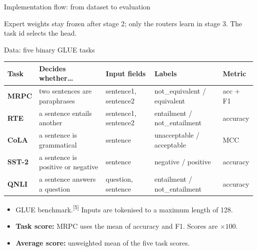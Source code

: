 \documentclass[aspectratio=169,10pt]{beamer}
\newcommand{\refm}[1]{\textsuperscript{\tiny[#1]}}
\begin{document}
\begin{frame}{Implementation flow: from dataset to evaluation}
  \vfill
  \raggedright
  {\footnotesize Expert weights stay frozen after stage 2; only the routers learn in stage 3. The task id selects the head.}
\end{frame}

\begin{frame}{Data: five binary GLUE tasks}
  \centering
  \footnotesize
  \renewcommand{\arraystretch}{1.25}
  \begin{tabularx}{\linewidth}{>{\bfseries}l X l l l}
    \toprule
    Task & Decides whether\ldots & Input fields & Labels & Metric\\
    \midrule
    MRPC & two sentences are paraphrases & sentence1, sentence2 & not\_equivalent / equivalent & acc + F1\\
    RTE & a sentence entails another & sentence1, sentence2 & entailment / not\_entailment & accuracy\\
    CoLA & a sentence is grammatical & sentence & unacceptable / acceptable & MCC\\
    SST-2 & a sentence is positive or negative & sentence & negative / positive & accuracy\\
    QNLI & a sentence answers a question & question, sentence & entailment / not\_entailment & accuracy\\
    \bottomrule
  \end{tabularx}
  \vfill
  \raggedright
  \begin{itemize}
    \item GLUE benchmark.\refm{5} Inputs are tokenised to a maximum length of 128.
    \item \textbf{Task score:} MRPC uses the mean of accuracy and F1. Scores are $\times 100$.
    \item \textbf{Average score:} unweighted mean of the five task scores.
  \end{itemize}
\end{frame}
\end{document}
